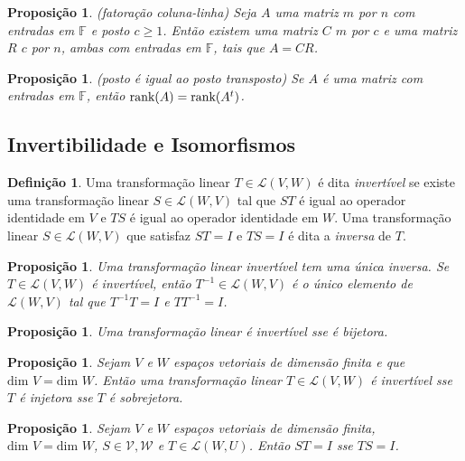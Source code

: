 \documentclass[12pt]{article}
\theoremstyle{plain}
\newtheorem{prop}[thm]{Proposição}
\theoremstyle{definition}
\newtheorem{defn}[thm]{Definição}
\theoremstyle{remark}
\begin{document}
\begin{prop} (fatoração coluna-linha)
    Seja \(A\) uma matriz \(m\) por \(n\) com entradas em \(\mathbb{F}\) e posto \(c \geq 1\). Então existem uma matriz \(C\) \(m\) por \(c\) e uma matriz \(R\) \(c\) por \(n\), ambas com entradas em \(\mathbb{F}\), tais que \(A = CR\).
\end{prop}

\begin{prop} (posto é igual ao posto transposto)
    Se \(A\) é uma matriz com entradas em \(\mathbb{F}\), então \(\textup{rank}(A) = \textup{rank}(A^t)\).
\end{prop}

\subsection{Invertibilidade e Isomorfismos}
\begin{defn}
    Uma transformação linear \(T \in \mathcal{L}(V, W)\) é dita \emph{invertível} se existe uma transformação linear \(S \in \mathcal{L}(W, V)\) tal que \(ST\) é igual ao operador identidade em \(V\) e \(TS\) é igual ao operador identidade em \(W\). Uma transformação linear \(S \in \mathcal{L}(W, V)\) que satisfaz \(ST = I\) e \(TS = I\) é dita a \emph{inversa} de \(T\).
\end{defn}

\begin{prop}
    Uma transformação linear invertível tem uma única inversa. Se \(T \in \mathcal{L}(V, W)\) é invertível, então \(T^{-1} \in \mathcal{L}(W, V)\) é o único elemento de \(\mathcal{L}(W, V)\) tal que \(T^{-1}T = I\) e \(TT^{-1} = I\).
\end{prop}

\begin{prop}
    Uma transformação linear é invertível sse é bijetora.
\end{prop}

\begin{prop}
    Sejam \(V\) e \(W\) espaços vetoriais de dimensão finita e que \(\text{dim } V = \text{dim } W\). Então uma transformação linear \(T \in \mathcal{L}(V, W)\) é invertível sse \(T\) é injetora sse \(T\) é sobrejetora.
\end{prop}

\begin{prop}
    Sejam \(V\) e \(W\) espaços vetoriais de dimensão finita, \(\text{dim } V = \text{dim } W\), \(S \in \mathcal{V, W}\) e \(T \in \mathcal{L}(W, U)\). Então \(ST = I\) sse \(TS = I\).
\end{prop}
\end{document}
